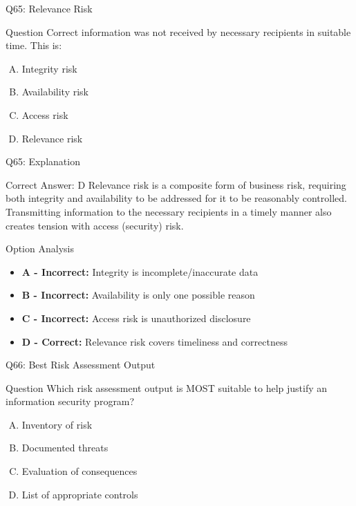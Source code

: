 \documentclass{beamer}
\begin{document}
	\begin{frame}{Q65: Relevance Risk}
		\begin{block}{Question}
			Correct information was not received by necessary recipients in suitable time. This is:
		\end{block}
		\begin{enumerate}[(A)]
			\item Integrity risk
			\item Availability risk
			\item Access risk
			\item Relevance risk
		\end{enumerate}
	\end{frame}
	
	\begin{frame}{Q65: Explanation}
		\begin{block}{Correct Answer: D}
			Relevance risk is a composite form of business risk, requiring both integrity and availability to be addressed for it to be reasonably controlled. Transmitting information to the necessary recipients in a timely manner also creates tension with access (security) risk.
		\end{block}
		\begin{block}{Option Analysis}
			\begin{itemize}
				\item \textbf{A - Incorrect:} Integrity is incomplete/inaccurate data
				\item \textbf{B - Incorrect:} Availability is only one possible reason
				\item \textbf{C - Incorrect:} Access risk is unauthorized disclosure
				\item \textbf{D - Correct:} Relevance risk covers timeliness and correctness
			\end{itemize}
		\end{block}
	\end{frame}
	
	\begin{frame}{Q66: Best Risk Assessment Output}
		\begin{block}{Question}
			Which risk assessment output is MOST suitable to help justify an information security program?
		\end{block}
		\begin{enumerate}[(A)]
			\item Inventory of risk
			\item Documented threats
			\item Evaluation of consequences
			\item List of appropriate controls
		\end{enumerate}
	\end{frame}
	
\end{document}
